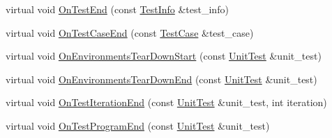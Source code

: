 \begin{DoxyCompactItemize}
\item 
virtual void \hyperlink{classtesting_1_1internal_1_1_test_event_repeater_aa0f13bded9369aae1c78583d7276f8b1}{On\-Test\-End} (const \hyperlink{classtesting_1_1_test_info}{Test\-Info} \&test\-\_\-info)
\item 
virtual void \hyperlink{classtesting_1_1internal_1_1_test_event_repeater_a0a335e1c3957a8c699ed56e37ea7b978}{On\-Test\-Case\-End} (const \hyperlink{classtesting_1_1_test_case}{Test\-Case} \&test\-\_\-case)
\item 
virtual void \hyperlink{classtesting_1_1internal_1_1_test_event_repeater_a30db75df2d9a65d787f31e16004613c2}{On\-Environments\-Tear\-Down\-Start} (const \hyperlink{classtesting_1_1_unit_test}{Unit\-Test} \&unit\-\_\-test)
\item 
virtual void \hyperlink{classtesting_1_1internal_1_1_test_event_repeater_a8428220c4cf9f0cea2dfd9a70f07ab7f}{On\-Environments\-Tear\-Down\-End} (const \hyperlink{classtesting_1_1_unit_test}{Unit\-Test} \&unit\-\_\-test)
\item 
virtual void \hyperlink{classtesting_1_1internal_1_1_test_event_repeater_a0e696d3c93a9f45fcf7142555fecad35}{On\-Test\-Iteration\-End} (const \hyperlink{classtesting_1_1_unit_test}{Unit\-Test} \&unit\-\_\-test, int iteration)
\item 
virtual void \hyperlink{classtesting_1_1internal_1_1_test_event_repeater_a4622616259747dbcc23f5ee39ef99ec0}{On\-Test\-Program\-End} (const \hyperlink{classtesting_1_1_unit_test}{Unit\-Test} \&unit\-\_\-test)
\end{DoxyCompactItemize}


